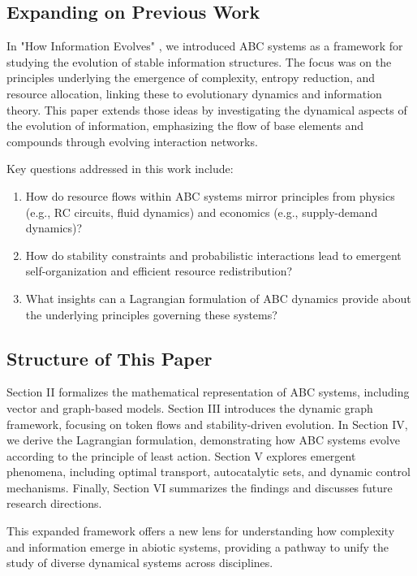 \documentclass[%
 preprint, linenumbers,
 amsmath,amssymb,
 aps, physrev,
]{revtex4-2}
\begin{document}
\subsection{Expanding on Previous Work}

In "How Information Evolves" \cite{adler2024howinfoevolves}, we introduced ABC systems as a framework for studying the evolution of stable information structures. The focus was on the principles underlying the emergence of complexity, entropy reduction, and resource allocation, linking these to evolutionary dynamics and information theory. This paper extends those ideas by investigating the dynamical aspects of the evolution of information, emphasizing the flow of base elements and compounds through evolving interaction networks.

Key questions addressed in this work include:
\begin{enumerate}
    \item How do resource flows within ABC systems mirror principles from physics (e.g., RC circuits, fluid dynamics) and economics (e.g., supply-demand dynamics)?
    \item How do stability constraints and probabilistic interactions lead to emergent self-organization and efficient resource redistribution?
    \item What insights can a Lagrangian formulation of ABC dynamics provide about the underlying principles governing these systems?
\end{enumerate}

\subsection{Structure of This Paper}

Section II formalizes the mathematical representation of ABC systems, including vector and graph-based models. Section III introduces the dynamic graph framework, focusing on token flows and stability-driven evolution. In Section IV, we derive the Lagrangian formulation, demonstrating how ABC systems evolve according to the principle of least action. Section V explores emergent phenomena, including optimal transport, autocatalytic sets, and dynamic control mechanisms. Finally, Section VI summarizes the findings and discusses future research directions.

This expanded framework offers a new lens for understanding how complexity and information emerge in abiotic systems, providing a pathway to unify the study of diverse dynamical systems across disciplines.
\end{document}
